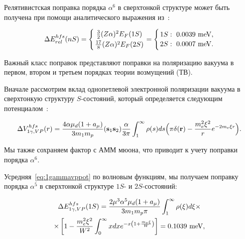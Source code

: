 Релятивистская поправка порядка $\alpha^6$ в сверхтонкой структуре может быть получена при помощи аналитического выражения из~\cite{breit}:

\begin{equation}

\label{eq:relat}

\Delta E^{hfs}_{rel}(nS)=\Biggl\{{{\frac{3}{2}(Z\alpha)^2E_F(1S)}\atop

{\frac{17}{8}(Z\alpha)^2E_F(2S)}}

=\Biggl\{{{1S:~0.0039~\rm meV,}\atop{2S:~0.0007~\rm meV.}}

\end{equation}



Важный класс поправок представляют поправки на поляризацию вакуума в первом, втором и третьем порядках теории возмущений (ТВ).

Вначале рассмотрим вклад однопетлевой электронной поляризации вакуума в сверхтонкую структуру $S$-состояний, который определяется следующим потенциалом~\cite{kp1996,t4}:

\begin{equation}

\label{eq:1gammavppot}

\Delta V^{hfs}_{1\gamma,VP}(r)=\frac{4\alpha\mu_d(1+a_\mu)}{3m_1m_p}

({\bf s}_1{\bf s}_2)

\frac{\alpha}{3\pi}

\int_1^\infty\rho(s)ds\Bigl(\pi\delta({\bf r})-\frac{m_e^2\xi^2}{r}e^{-2m_e\xi r}\Bigr).

\end{equation}

Мы также сохраняем фактор с АММ мюона, что приводит к учету поправки порядка $\alpha^6$.

Усредняя~\eqref{eq:1gammavppot} по волновым функциям, мы получаем поправку порядка $\alpha^5$ в сверхтонкой структуре $1S$- и $2S$-состояний:

\begin{multline}

\label{eq:1gammavp1s}

\Delta E_{1\gamma,VP}^{hfs}(1S)=\frac{2\mu^3 \alpha^5\mu_d(1+a_\mu)}{3m_1m_p\pi}\int_1^\infty

\rho(\xi)d\xi \times

\\

\times\left[1-\frac{m_e^2\xi^2}{W^2}\int_0^\infty xdxe^{-x\left(1+\frac{m_e\xi}{W}\right)}\right]=

0.1039~\rm meV,

\end{multline}

